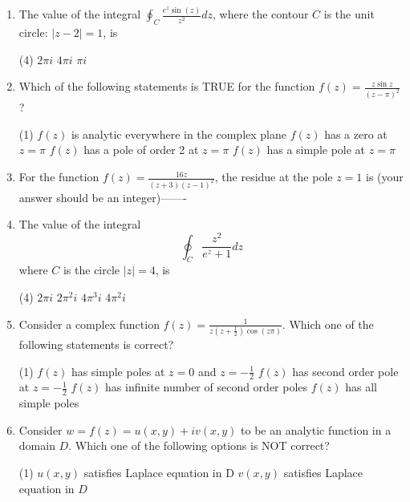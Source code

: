 \begin{enumerate}[label=\color{ocre}\textbf{\arabic*.}]
	\item  The value of the integral $\oint_{C} \frac{e^{z} \sin (z)}{z^{2}} d z$, where the contour $C$ is the unit circle: $|z-2|=1$, is
	{}
	\begin{tasks}(4)
		\task[\textbf{A.}] $2 \pi i$
		\task[\textbf{B.}] $4 \pi i$
		\task[\textbf{C.}] $\pi i$
	\end{tasks}
	\item Which of the following statements is TRUE for the function $f(z)=\frac{z \sin z}{(z-\pi)^{2}}$ ?
	{}
	\begin{tasks}(1)
		\task[\textbf{A.}] $f(z)$ is analytic everywhere in the complex plane
		\task[\textbf{B.}] $f(z)$ has a zero at $z=\pi$
		\task[\textbf{C.}] $f(z)$ has a pole of order 2 at $z=\pi$
		\task[\textbf{D.}] $f(z)$ has a simple pole at $z=\pi$
	\end{tasks}
	\item For the function $f(z)=\frac{16 z}{(z+3)(z-1)^{2}}$, the residue at the pole $z=1$ is (your answer should be an integer)-------
	{}
	\item The value of the integral
	$$
	\oint_{C} \frac{z^{2}}{e^{z}+1} d z
	$$
	where $C$ is the circle $|z|=4$, is
	{}
	\begin{tasks}(4)
		\task[\textbf{A.}] $2 \pi i$
		\task[\textbf{B.}] $2 \pi^{2} i$
		\task[\textbf{C.}]  $4 \pi^{3} i$
		\task[\textbf{D.}] $4 \pi^{2} i$
	\end{tasks}
	\item Consider a complex function $f(z)=\frac{1}{z\left(z+\frac{1}{2}\right) \cos (z \pi)}$. Which one of the following statements is correct?
	{}
	\begin{tasks}(1)
		\task[\textbf{A.}] $f(z)$ has simple poles at $z=0$ and $z=-\frac{1}{2}$
		\task[\textbf{B.}] $f(z)$ has second order pole at $z=-\frac{1}{2}$
		\task[\textbf{C.}] $f(z)$ has infinite number of second order poles
		\task[\textbf{D.}] $f(z)$ has all simple poles
	\end{tasks}
	\item  Consider $w=f(z)=u(x, y)+i v(x, y)$ to be an analytic function in a domain $D$. Which one of the following options is NOT correct?
	{}
	\begin{tasks}(1)
		\task[\textbf{A.}] $u(x, y)$ satisfies Laplace equation in D
		\task[\textbf{B.}]  $v(x, y)$ satisfies Laplace equation in $D$

\end{tasks}
\end{enumerate}
